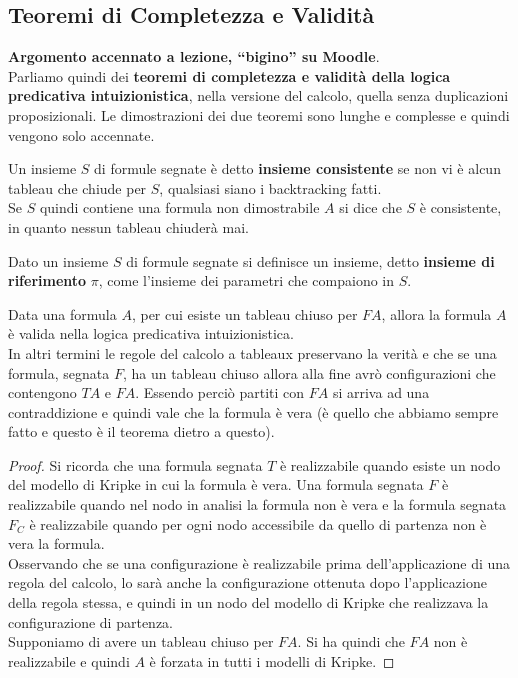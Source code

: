 \documentclass[a4paper,12pt, oneside]{book}
\begin{document}
\subsection{Teoremi di Completezza e Validità}
\textbf{Argomento accennato a lezione, ``bigino'' su Moodle}.\\
Parliamo quindi dei \textbf{teoremi di completezza e validità della logica
  predicativa intuizionistica}, nella versione del calcolo, quella senza
duplicazioni proposizionali. Le dimostrazioni dei due teoremi sono lunghe e
complesse e quindi vengono solo accennate.
\begin{definizione}
  Un insieme $S$ di formule segnate è detto \textbf{insieme consistente} se non
  vi è alcun tableau che chiude per $S$, qualsiasi siano i backtracking fatti.\\
  Se $S$ quindi contiene una formula non dimostrabile $A$ si dice che $S$ è
  consistente, in quanto nessun tableau chiuderà mai.
\end{definizione}
\begin{definizione}
   Dato un insieme $S$ di formule segnate si definisce un insieme, detto
   \textbf{insieme di riferimento} $\pi$, come l’insieme dei parametri che
   compaiono in $S$.
\end{definizione}
\begin{teorema}
  Data una formula $A$, per cui esiste un tableau chiuso per $FA$, allora la
  formula $A$ è valida nella logica predicativa intuizionistica.\\
  In altri termini le regole del calcolo a tableaux preservano la verità e che
  se una formula, segnata $F$, ha un tableau chiuso allora alla fine avrò
  configurazioni che contengono $TA$ e $FA$. Essendo perciò partiti con $FA$ si
  arriva ad una contraddizione e quindi vale che la formula è vera (è quello che
  abbiamo sempre fatto e questo è il teorema dietro a questo).
\end{teorema}
\begin{proof}
  Si ricorda che una formula segnata $T$ è realizzabile quando esiste un nodo
  del modello di Kripke in cui la formula è vera. Una formula segnata $F$ è
  realizzabile quando nel nodo in analisi la formula non è vera e la
  formula segnata $F_C$ è realizzabile quando per ogni nodo accessibile da
  quello di partenza non è vera la formula.\\
  Osservando che se una configurazione è realizzabile prima
  dell’applicazione di una regola del calcolo, lo sarà anche la configurazione
  ottenuta dopo l’applicazione della regola stessa, e quindi in un nodo del
  modello di Kripke che realizzava la configurazione di partenza. \\
  Supponiamo di avere un tableau chiuso per $FA$. Si ha quindi che $FA$ non è
  realizzabile e quindi $A$ è forzata in tutti i modelli di Kripke. 
\end{proof}
\end{document}
